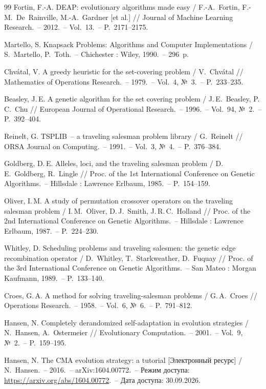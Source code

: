 \begin{thebibliography}{99}
Fortin, F.-A. DEAP: evolutionary algorithms made easy / F.-A.~Fortin, F.-M.~De~Rainville,
M.-A.~Gardner [et al.] // Journal of Machine Learning Research.~-- 2012.~-- Vol.~13.~-- P.~2171--2175.

Martello, S. Knapsack Problems: Algorithms and Computer Implementations / S.~Martello, P.~Toth.~--
Chichester : Wiley, 1990.~-- 296~p.

Chvátal, V. A greedy heuristic for the set-covering problem / V.~Chvátal // Mathematics of Operations
Research.~-- 1979.~-- Vol.~4, №~3.~-- P.~233--235.

Beasley, J.\,E. A genetic algorithm for the set covering problem / J.\,E.~Beasley, P.\,C.~Chu // European
Journal of Operational Research.~-- 1996.~-- Vol.~94, №~2.~-- P.~392--404.

Reinelt, G. TSPLIB~-- a traveling salesman problem library / G.~Reinelt // ORSA Journal on
Computing.~-- 1991.~-- Vol.~3, №~4.~-- P.~376--384.

Goldberg, D.\,E. Alleles, loci, and the traveling salesman problem / D.\,E.~Goldberg, R.~Lingle //
Proc. of the 1st International Conference on Genetic Algorithms.~-- Hillsdale : Lawrence Erlbaum,
1985.~-- P.~154--159.

Oliver, I.\,M. A study of permutation crossover operators on the traveling salesman problem /
I.\,M.~Oliver, D.\,J.~Smith, J.\,R.\,C.~Holland // Proc. of the 2nd International Conference on
Genetic Algorithms.~-- Hillsdale : Lawrence Erlbaum, 1987.~-- P.~224--230.

Whitley, D. Scheduling problems and traveling salesmen: the genetic edge recombination operator /
D.~Whitley, T.~Starkweather, D.~Fuquay // Proc. of the 3rd International Conference on Genetic
Algorithms.~-- San Mateo : Morgan Kaufmann, 1989.~-- P.~133--140.

Croes, G.\,A. A method for solving traveling-salesman problems / G.\,A.~Croes // Operations
Research.~-- 1958.~-- Vol.~6, №~6.~-- P.~791--812.

Hansen, N. Completely derandomized self-adaptation in evolution strategies / N.~Hansen, A.~Ostermeier //
Evolutionary Computation.~-- 2001.~-- Vol.~9, №~2.~-- P.~159--195.

Hansen, N. The CMA evolution strategy: a tutorial [Электронный ресурс] / N.~Hansen.~-- 2016.~--
arXiv:1604.00772.~-- Режим доступа: \url{https://arxiv.org/abs/1604.00772}.~-- Дата доступа: 30.09.2026.


\end{thebibliography}
